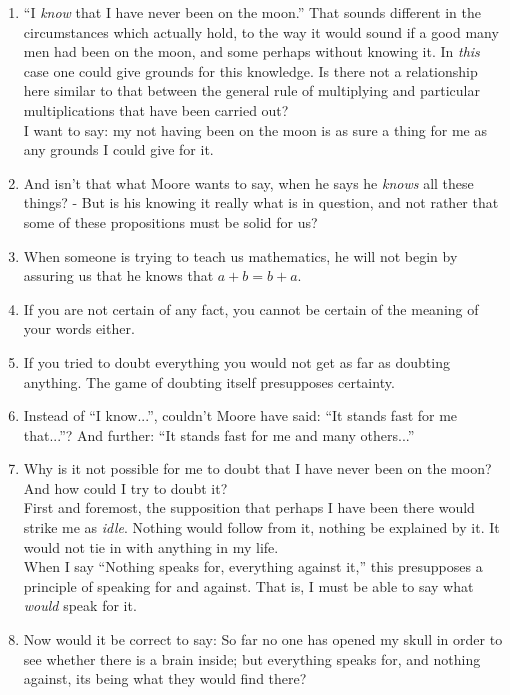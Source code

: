 \documentclass{book}
\begin{document}
\begin{enumerate}
\item
``I \emph{know} that I have never been on the moon.'' That sounds different in the
circumstances which actually hold, to the way it would sound if a good many men
had been on the moon, and some perhaps without knowing it. In \emph{this} case
one could give grounds for this knowledge. Is there not a relationship here
similar to that between the general rule of multiplying and particular
multiplications that have been carried out? \\
I want to say: my not having been on the moon is as sure a thing for me as any
grounds I could give for it.

\item
And isn't that what Moore wants to say, when he says he \emph{knows} all these
things?  - But is his knowing it really what is in question, and not rather
that some of these propositions must be solid for us?

\item
When someone is trying to teach us mathematics, he will not begin by assuring
us that he knows that $a+b=b+a$.

\item
If you are not certain of any fact, you cannot be certain of the meaning of
your words either.

\item
If you tried to doubt everything you would not get as far as doubting anything.
The game of doubting itself presupposes certainty.

\item
Instead of ``I know...'', couldn't Moore have said: ``It stands fast for me
that...''? And further: ``It stands fast for me and many others...''

\item
Why is it not possible for me to doubt that I have never been on the moon? And
how could I try to doubt it? \\
First and foremost, the supposition that perhaps I have been there would strike
me as \emph{idle}. Nothing would follow from it, nothing be explained by it. It
would not tie in with anything in my life. \\
When I say ``Nothing speaks for, everything against it,'' this presupposes a
principle of speaking for and against. That is, I must be able to say what
\emph{would} speak for it.

\item
Now would it be correct to say: So far no one has opened my skull in order to
see whether there is a brain inside; but everything speaks for, and nothing
against, its being what they would find there?


\end{enumerate}
\end{document}
